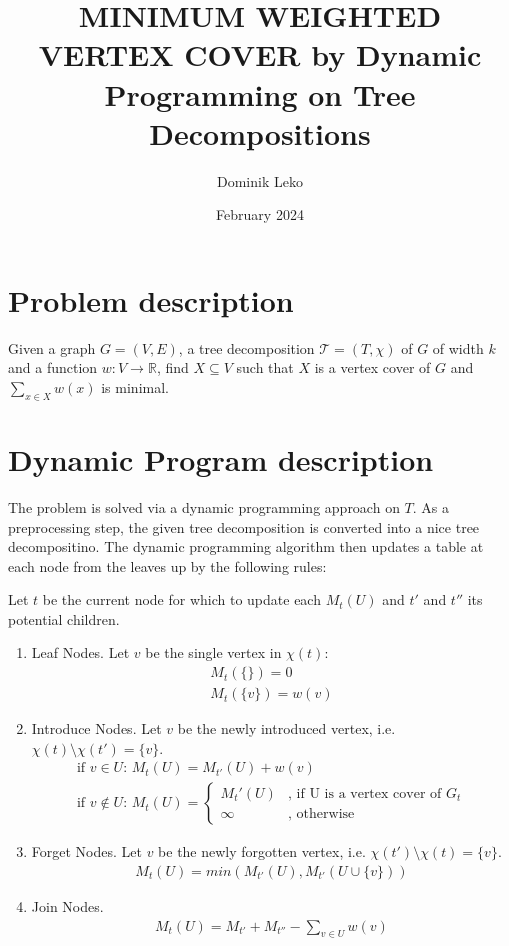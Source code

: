 \documentclass{article}
\title{MINIMUM WEIGHTED VERTEX COVER by Dynamic Programming on Tree Decompositions}
\author{Dominik Leko}
\date{February 2024}
\begin{document}
\maketitle

\section{Problem description}

Given a graph $G = (V, E)$, a tree decomposition $\mathcal{T} = (T, \chi)$ of $G$ of width $k$ and a function $w : V \rightarrow \mathbb{R}$, find $X \subseteq V$ such that $X$ is a vertex cover of $G$ and $\sum_{x \in X} w(x)$ is minimal.

\section{Dynamic Program description}

The problem is solved via a dynamic programming approach on $T$. As a preprocessing step, the given tree decomposition is converted into a nice tree decompositino. The dynamic programming algorithm then updates a table at each node from the leaves up by the following rules:

Let $t$ be the current node for which to update each $M_t(U)$ and $t'$ and $t''$ its potential children.

\begin{enumerate}
    \item Leaf Nodes. Let $v$ be the single vertex in $\chi(t)$:
    \begin{gather*}
        M_t(\{\}) = 0 \\
        M_t(\{v\}) = w(v)
    \end{gather*}
    \item Introduce Nodes. Let $v$ be the newly introduced vertex, i.e. $\chi(t) \setminus \chi(t') = \{v\}$.
    \begin{gather*}
        \text{if $v \in U$: } M_t(U) = M_{t'}(U) + w(v)\\
        \text{if $v \notin U$: } M_t(U) =
        \begin{cases}
            M_t'(U) & \text{, if U is a vertex cover of $G_t$} \\
            \infty & \text{, otherwise}
        \end{cases}
    \end{gather*}
    \item Forget Nodes. Let $v$ be the newly forgotten vertex, i.e. $\chi(t') \setminus \chi(t) = \{v\}$.
    \begin{gather*}
        M_t(U) = min(M_{t'}(U), M_{t'}(U \cup \{v\}))
    \end{gather*}
    \item Join Nodes.
    \begin{gather*}
        M_t(U) = M_{t'} + M_{t''} - \sum_{v \in U} w(v)
    \end{gather*}
\end{enumerate}
\end{document}
